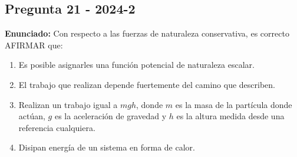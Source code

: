 \documentclass{article}
\begin{document}
\subsection*{Pregunta 21 - 2024-2}
\textbf{Enunciado:} Con respecto a las fuerzas de naturaleza conservativa, es correcto AFIRMAR que:
\begin{enumerate}
    \item[a)] Es posible asignarles una función potencial de naturaleza escalar.
    \item[b)] El trabajo que realizan depende fuertemente del camino que describen.
    \item[c)] Realizan un trabajo igual a $mgh$, donde $m$ es la masa de la partícula donde actúan, $g$ es la aceleración de gravedad y $h$ es la altura medida desde una referencia cualquiera.
    \item[d)] Disipan energía de un sistema en forma de calor.
\end{enumerate}
\vspace{0.5cm}



\newpage
\begingroup
\let\clearpage\relax
\vspace*{1cm}
\end{document}
